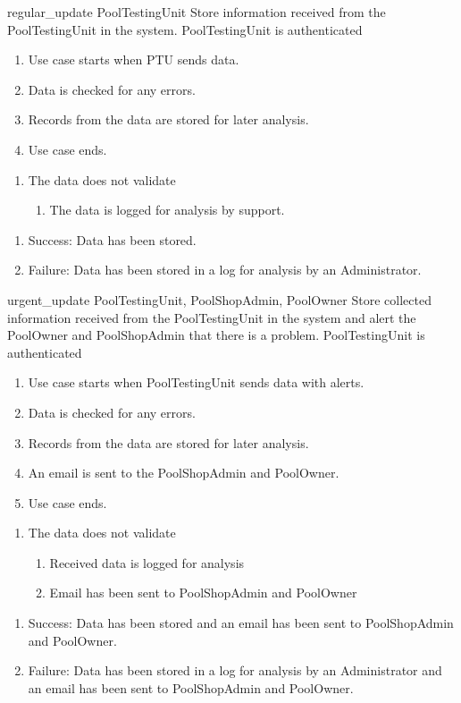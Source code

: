 \usecase
{regular\_update}
{PoolTestingUnit}
{Store information received from the PoolTestingUnit in the system.}
{PoolTestingUnit is authenticated}
{
\begin{enumerate}
\item Use case starts when PTU sends data.
\item Data is checked for any errors.
\item Records from the data are stored for later analysis.
\item Use case ends.
\end{enumerate}
}
{
\begin{enumerate}
\item The data does not validate
\begin{enumerate}
\item The data is logged for analysis by support.
\end{enumerate}
\end{enumerate}
}
{\begin{enumerate}
\item Success: Data has been stored.
\item Failure: Data has been stored in a log for analysis by an Administrator.
\end{enumerate}
}

\usecase
{urgent\_update}
{PoolTestingUnit, PoolShopAdmin, PoolOwner}
{Store collected information received from the PoolTestingUnit in the system and alert the PoolOwner and PoolShopAdmin that there is a problem.}
{PoolTestingUnit is authenticated}
{
\begin{enumerate}
\item Use case starts when PoolTestingUnit sends data with alerts.
\item Data is checked for any errors.
\item Records from the data are stored for later analysis.
\item An email is sent to the PoolShopAdmin and PoolOwner.
\item Use case ends.
\end{enumerate}
}
{
\begin{enumerate}
\item The data does not validate
\begin{enumerate}
\item Received data is logged for analysis
\item Email has been sent to PoolShopAdmin and PoolOwner
\end{enumerate}
\end{enumerate}
}
{
\begin{enumerate}
\item Success: Data has been stored and an email has been sent to PoolShopAdmin and PoolOwner.
\item Failure: Data has been stored in a log for analysis by an Administrator and an email has been sent to PoolShopAdmin and PoolOwner.
\end{enumerate}
}


